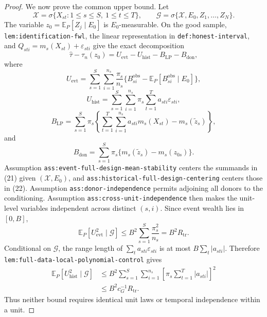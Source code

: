 \documentclass{article}
\begin{document}
\begin{proof}
We now prove the common upper bound.  Let
\[
\mathscr X=\sigma\{X_{st}:1\leq s\leq S,\ 1\leq t\leq T\},
\qquad
\mathscr G=\sigma\{\mathscr X,E_0,Z_1,\ldots,Z_N\}.
\]
The variable \(z_0=\mathbb E_P[Z_j\mid E_0]\) is \(E_0\)-measurable.  On the good sample, \texttt{lem:identification-fwl}, the linear representation in \texttt{def:honest-interval}, and \(Q_{sti}=m_s(X_{st})+\varepsilon_{sti}\) give the exact decomposition
\[
\widehat\tau-\tau_n(z_0)
=U_{\mathrm{evt}}-U_{\mathrm{hist}}-B_{\mathrm{LP}}-B_{\mathrm{don}},
\tag{20}
\]
where
\[
U_{\mathrm{evt}}
=\sum_{s=1}^{S}\sum_{i=1}^{n_s}\frac{\pi_s}{n_s}
\{B_{si}^{\mathrm{obs}}-\mathbb E_P[B_{si}^{\mathrm{obs}}\mid E_0]\},
\tag{21}
\]
\[
U_{\mathrm{hist}}
=\sum_{s=1}^{S}\sum_{i=1}^{n_s}\pi_s
\sum_{t=1}^{T}a_{sti}\varepsilon_{sti},
\tag{22}
\]
\[
B_{\mathrm{LP}}
=\sum_{s=1}^{S}\pi_s
\left\{\sum_{t=1}^{T}\sum_{i=1}^{n_s}a_{sti}m_s(X_{st})
-m_s(\widetilde z_s)\right\},
\tag{23}
\]
and
\[
B_{\mathrm{don}}
=\sum_{s=1}^{S}\pi_s\{m_s(\widetilde z_s)-m_s(z_{0s})\}.
\tag{24}
\]
Assumption \texttt{ass:event-full-design-mean-stability} centers the summands in (21) given \((\mathscr X,E_0)\), and \texttt{ass:historical-full-design-centering} centers those in (22).  Assumption \texttt{ass:donor-independence} permits adjoining all donors to the conditioning.  Assumption \texttt{ass:cross-unit-independence} then makes the unit-level variables independent across distinct \((s,i)\).  Since event wealth lies in \([0,B]\),
\[
\mathbb E_P[U_{\mathrm{evt}}^2\mid\mathscr G]
\leq B^2\sum_{s=1}^{S}\frac{\pi_s^2}{n_s}
=B^2R_{\mathrm{tr}}.
\tag{25}
\]
Conditional on \(\mathscr G\), the range length of
\(\sum_ta_{sti}\varepsilon_{sti}\) is at most
\(B\sum_t|a_{sti}|\).  Therefore \texttt{lem:full-data-local-polynomial-control} gives
\[
\begin{aligned}
\mathbb E_P[U_{\mathrm{hist}}^2\mid\mathscr G]
&\leq B^2\sum_{s=1}^{S}\sum_{i=1}^{n_s}
\left[\pi_s\sum_{t=1}^{T}|a_{sti}|\right]^2\\
&\leq B^2c_G^{-1}R_{\mathrm{tr}}.
\end{aligned}
\tag{26}
\]
Thus neither bound requires identical unit laws or temporal independence within a unit.


\end{proof}
\end{document}
